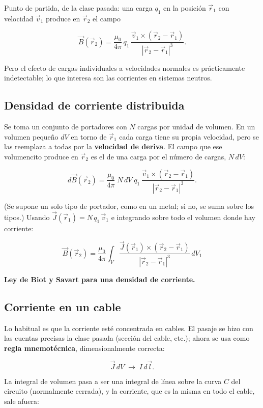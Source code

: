 \documentclass[12pt,a4paper]{article}
\begin{document}
Punto de partida, de la clase pasada: una carga $q_1$ en la posición $\vec r_1$
con velocidad $\vec v_1$ produce en $\vec r_2$ el campo

\[
\vec B(\vec r_2) = \frac{\mu_0}{4\pi}\,q_1\,
\frac{\vec v_1\times(\vec r_2-\vec r_1)}{|\vec r_2-\vec r_1|^3} .
\]

Pero el efecto de cargas individuales a velocidades normales es prácticamente
indetectable; lo que interesa son las corrientes en sistemas neutros.

\subsection{Densidad de corriente distribuida}

Se toma un conjunto de portadores con $N$ cargas por unidad de volumen. En un
volumen pequeño $dV$ en torno de $\vec r_1$ cada carga tiene su propia
velocidad, pero se las reemplaza a todas por la \textbf{velocidad de deriva}. El
campo que ese volumencito produce en $\vec r_2$ es el de una carga por el
número de cargas, $N\,dV$:

\[
d\vec B(\vec r_2) = \frac{\mu_0}{4\pi}\;N\,dV\;q_1\,
\frac{\vec v_1\times(\vec r_2-\vec r_1)}{|\vec r_2-\vec r_1|^3} .
\]

(Se supone un solo tipo de portador, como en un metal; si no, se suma sobre los
tipos.) Usando $\vec J(\vec r_1) = N\,q_1\,\vec v_1$ e integrando sobre todo el
volumen donde hay corriente:

\begin{keybox}
\[
\boxed{\ \vec B(\vec r_2) = \frac{\mu_0}{4\pi}\int_V
\frac{\vec J(\vec r_1)\times(\vec r_2-\vec r_1)}{|\vec r_2-\vec r_1|^3}\,dV_1\ }
\]
\end{keybox}

\textbf{Ley de Biot y Savart para una densidad de corriente.}

\subsection{Corriente en un cable}

Lo habitual es que la corriente esté concentrada en cables. El pasaje se hizo
con las cuentas precisas la clase pasada (sección del cable, etc.); ahora se
usa como \textbf{regla mnemotécnica}, dimensionalmente correcta:

\[
\vec J\,dV \;\longrightarrow\; I\,d\vec l .
\]

La integral de volumen pasa a ser una integral de línea sobre la curva $C$ del
circuito (normalmente cerrada), y la corriente, que es la misma en todo el
cable, sale afuera:
\end{document}
